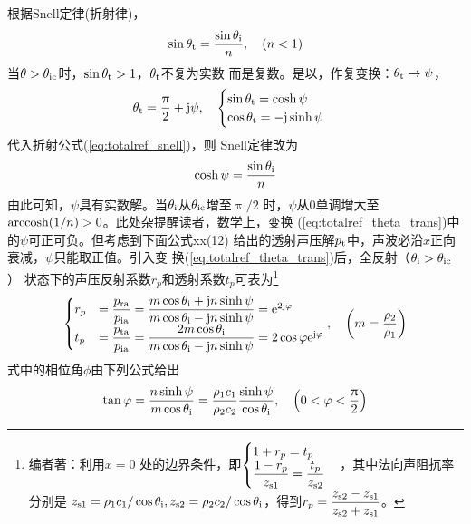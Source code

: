 \documentclass[UTF8]{ctexbook}
\begin{document}
根据Snell定律(折射律)，
\begin{equation}
	\label{eq:totalref_snell}
	\sin\theta\st{t} = \frac{\sin\theta\st{i}}{n}\qc (n<1)
\end{equation}
当$\theta>\theta_\text{ic}$时，$\sin\theta_\text{t}>1$，$\theta_\text{t}$不复为实数
而是复数。是以，作复变换：$\theta_\text{t} \rightarrow \psi$，
\begin{equation}
	\label{eq:totalref_theta_trans}
	\theta\st{t} = \frac{\uppi}{2}+\mj \psi\qc 
	\begin{cases}
		\sin \theta\st{t} = \cosh \psi\\
		\cos\theta\st{t} = -\mj \sinh \psi
	\end{cases}
\end{equation}
代入折射公式(\ref{eq:totalref_snell})，则 Snell定律改为
\begin{equation}
	\label{eq:totalref_snell2}
	\cosh \psi = \frac{\sin \theta_\text{i}}{n}
\end{equation}
由此可知，$\psi$具有实数解。当$\theta_\text{i}$从$\theta_\text{ic}$增至$\uppi/2$
时，$\psi$从$0$单调增大至$\operatorname{arccosh}(1/n)>0$。此处杂提醒读者，数学上，变换
(\ref{eq:totalref_theta_trans})中的$\psi$可正可负。但考虑到下面公式xx(12)
给出的透射声压解$p_\text{t}$中，声波必沿$x$正向衰减，$\psi$只能取正值。引入变
换(\ref{eq:totalref_theta_trans})后，全反射（$\theta_\text{i}>\theta_\text{ic}$）
状态下的声压反射系数$r_p$和透射系数$t_p$可表为\footnote{编者著：利用$x=0$
处的边界条件，即$\begin{cases}1+r_p = t_p\\ \dfrac{1-r_p}{z_\text{s1}} =
	\dfrac{t_p}{z_\text{s2}}\end{cases}$，其中法向声阻抗率分别是
$z_\text{s1}= \rho_1c_1/\cos \theta_\text{i}, z_\text{s2} = \rho_2c_2
/\cos\theta_\text{i}$，得到$r_p = \dfrac{z_\text{s2}-z_\text{s1}}{z_\text{s2}+z_\text{s1}}
$。}
\begin{equation}
	\label{eq:totalref_rptp}
	\begin{cases}
		r_p & = \dfrac{p\st{ra}}{p\st{ia}} = \dfrac{m\cos \theta \st{i} +
	\mj n \sinh \psi }{m\cos \theta\st{i} - \mj n \sinh \psi} = 
	\me^{2\mj \phi}\\
	t_p&=\dfrac{p\st{ta}}{p\st{ia}} = \dfrac{2m\cos \theta \st{i}}{m\cos 
		\theta\st{i} - \mj n \sinh \psi} = 2\cos\phi \me^{\mj \phi}
	\end{cases}
	\qc \qty(m = \frac{\rho_2}{\rho_1})
\end{equation}
式中的相位角$\phi$由下列公式给出
\begin{equation}
	\tan \phi = \frac{n\sinh \psi}{m \cos \theta\st{i}} = 
	\frac{\rho_1c_1}{\rho_2c_2} \frac{\sinh \psi}{\cos \theta\st{i}}
	\qc \qty(0<\phi<\frac{\uppi}{2})
\end{equation}
\end{document}

